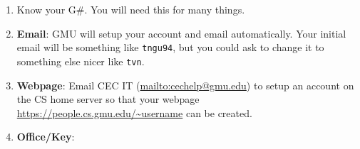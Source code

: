 \documentclass[oneside,11pt]{book}
\newcommand{\code}{\texttt}
\begin{document}
\begin{enumerate}
\item Know your G\#. You will need this for many things.
\item \textbf{Email}: GMU will setup your account and email automatically. Your initial email will be something like \code{tngu94}, but you could ask to change it to something else nicer like \code{tvn}.
\item \textbf{Webpage}: Email CEC IT (\url{mailto:cechelp@gmu.edu}) to setup an account on the CS home server so that your webpage \url{https://people.cs.gmu.edu/~username} can be created. 
\item \textbf{Office/Key}: 


\end{enumerate}
\end{document}
